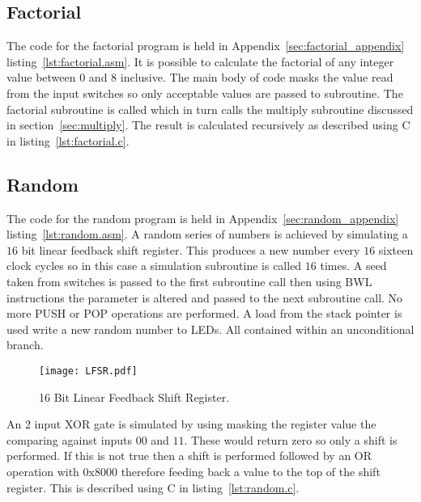 \subsection{Factorial}
\label{sec:factorial}
The code for the factorial program is held in Appendix~\ref{sec:factorial_appendix} listing~\ref{lst:factorial.asm}.
It is possible to calculate the factorial of any integer value between $0$ and $8$ inclusive.
The main body of code masks the value read from the input switches so only acceptable values are passed to subroutine.
The factorial subroutine is called which in turn calls the multiply subroutine discussed in section~\ref{sec:multiply}. 
The result is calculated recursively as described using C in listing~\ref{lst:factorial.c}. 









\subsection{Random}
The code for the random program is held in Appendix~\ref{sec:random_appendix} listing~\ref{lst:random.asm}.
A random series of numbers is achieved by simulating a $16$ bit linear feedback shift register. 
This produces a new number every $16$ sixteen clock cycles so in this case a simulation subroutine is called $16$ times.
A seed taken from switches is passed to the first subroutine call then using BWL instructions the parameter is altered and passed to the next subroutine call.
No more PUSH or POP operations are performed.
A load from the stack pointer is used write a new random number to LEDs.
All contained within an unconditional branch.

\begin{figure}[ht]
   \centering
    \texttt{[image: LFSR.pdf]}
   \caption{16 Bit Linear Feedback Shift Register.}
   \label{fig:circles}
\end{figure}

An 2 input XOR gate is simulated by using masking the register value the comparing against inputs $00$ and $11$.
These would return zero so only a shift is performed.
If this is not true then a shift is performed followed by an OR operation with $0$x$8000$ therefore feeding back a value to the top of the shift register.
This is described using C in listing~\ref{lst:random.c}. 

